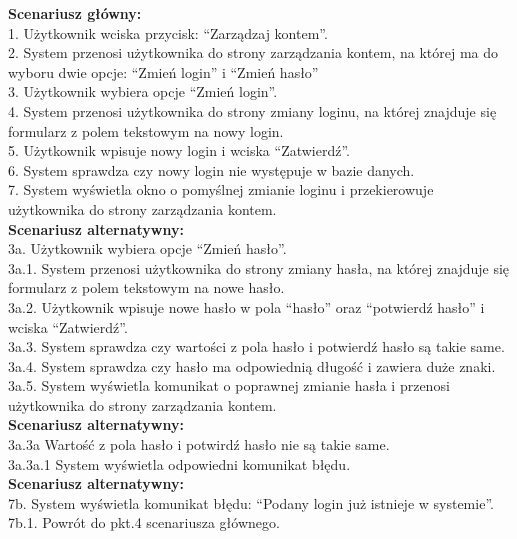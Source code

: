 \begin{enumerate}[label=(\Roman*)]
\textbf{Scenariusz główny:}\\
	1. Użytkownik wciska przycisk: “Zarządzaj kontem”.\\
	2. System przenosi użytkownika do strony zarządzania kontem, na której ma do wyboru
	dwie opcje: “Zmień login” i “Zmień hasło”\\
	3. Użytkownik wybiera opcje “Zmień login”.\\
	4. System przenosi użytkownika do strony zmiany loginu, na której znajduje się
	formularz z polem tekstowym na nowy login.\\
	5. Użytkownik wpisuje nowy login i wciska “Zatwierdź”.\\
	6. System sprawdza czy nowy login nie występuje w bazie danych.\\
	7. System wyświetla okno o pomyślnej zmianie loginu i przekierowuje użytkownika do
strony zarządzania kontem.\\
\textbf{Scenariusz alternatywny:}\\
3a. Użytkownik wybiera opcje “Zmień hasło”.\\
3a.1. System przenosi użytkownika do strony zmiany hasła, na której znajduje się formularz
z polem tekstowym na nowe hasło.\\
3a.2. Użytkownik wpisuje nowe hasło w pola “hasło” oraz “potwierdź hasło” i wciska
“Zatwierdź”.\\
3a.3. System sprawdza czy wartości z pola hasło i potwierdź hasło są takie same.\\
3a.4. System sprawdza czy hasło ma odpowiednią długość i zawiera duże znaki.\\
3a.5. System wyświetla komunikat o poprawnej zmianie hasła i przenosi użytkownika do
strony zarządzania kontem.\\
\textbf{Scenariusz alternatywny:}\\
3a.3a Wartość z pola hasło i potwirdź hasło nie są takie same.\\
3a.3a.1 System wyświetla odpowiedni komunikat błędu.\\
\textbf{Scenariusz alternatywny:}\\
7b. System wyświetla komunikat błędu: “Podany login już istnieje w systemie”.\\
7b.1. Powrót do pkt.4 scenariusza głównego.\\


\end{enumerate}
